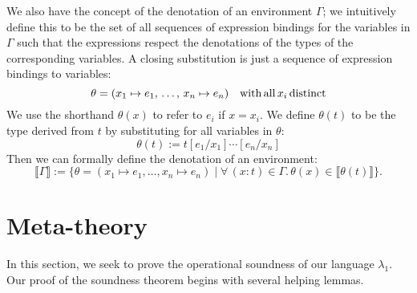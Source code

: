 \documentclass[11pt]{article}
\newcommand{\lb}{\llbracket}         %
\newcommand{\rb}{\rrbracket}         %
\begin{document}
We also have the concept of the denotation of an environment $\Gamma$; we intuitively define this to be the set of all sequences of expression bindings for the variables in $\Gamma$ such that the expressions respect the denotations of the types of the corresponding variables.
A closing substitution is just a sequence of expression bindings to variables:
\[
\theta = (x_1\mapsto e_1,\,\ldots,\, x_n\mapsto e_n)
\quad {\rm with\, all}\, x_i\, {\rm distinct}
\]
We use the shorthand $\theta(x)$ to refer to $e_i$ if $x = x_i$. We define $\theta(t)$ to be the type derived from $t$ by substituting for all variables in $\theta$:
\[
\theta(t) := t[e_1/x_1]\cdots[e_n/x_n]
\]
Then we can formally define the denotation of an environment:
\[
\lb \Gamma \rb := \{ \theta = (x_1 \mapsto e_1,\ldots, x_n \mapsto e_n) \; | \;
\forall\, (x:t) \in \Gamma.\, \theta(x) \in \lb\theta(t)\rb \}.
\]

\section{Meta-theory}

In this section, we seek to prove the operational soundness of our language $\lambda_1$.
Our proof of the soundness theorem begins with several helping lemmas.
\end{document}

